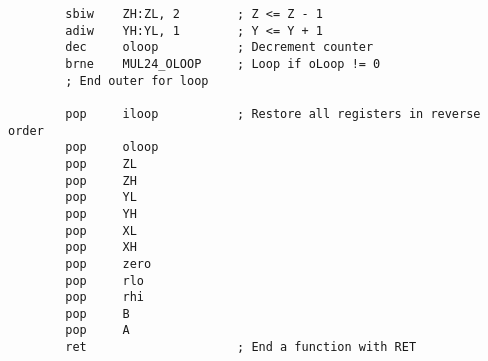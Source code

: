 \documentclass[12pt,letterpaper]{article}
\begin{document}
\begin{verbatim}
        sbiw    ZH:ZL, 2        ; Z <= Z - 1
        adiw    YH:YL, 1        ; Y <= Y + 1
        dec     oloop           ; Decrement counter
        brne    MUL24_OLOOP     ; Loop if oLoop != 0
        ; End outer for loop
                
        pop     iloop           ; Restore all registers in reverse order
        pop     oloop
        pop     ZL              
        pop     ZH
        pop     YL
        pop     YH
        pop     XL
        pop     XH
        pop     zero
        pop     rlo
        pop     rhi
        pop     B
        pop     A
        ret                     ; End a function with RET
\end{verbatim}
\end{document}
